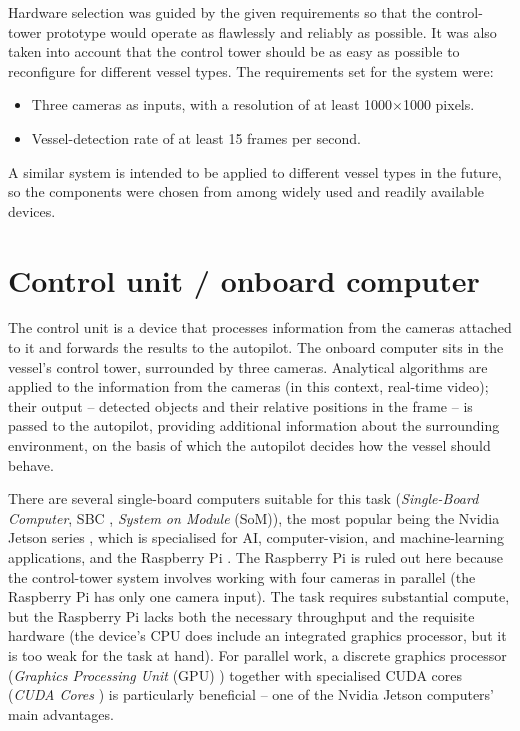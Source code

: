 
Hardware selection was guided by the given requirements so that the control-tower prototype would operate as flawlessly and reliably as possible. It was also taken into account that the control tower should be as easy as possible to reconfigure for different vessel types. The requirements set for the system were:

\begin{itemize}
\item
  Three cameras as inputs, with a resolution of at least 1000$\times$1000 pixels.
\item
  Vessel-detection rate of at least 15 frames per second.
\end{itemize}

A similar system is intended to be applied to different vessel types in the future, so the components were chosen from among widely used and readily available devices.

\section{Control unit / onboard computer}\label{control-unit-onboard-computer}

The control unit is a device that processes information from the cameras attached to it and forwards the results to the autopilot. The onboard computer sits in the vessel's control tower, surrounded by three cameras. Analytical algorithms are applied to the information from the cameras (in this context, real-time video); their output -- detected objects and their relative positions in the frame -- is passed to the autopilot, providing additional information about the surrounding environment, on the basis of which the autopilot decides how the vessel should behave.

There are several single-board computers suitable for this task (\emph{Single-Board Computer}, SBC \cite{ref19}, \emph{System on Module} (SoM)), the most popular being the Nvidia Jetson series \cite{ref20}, which is specialised for AI, computer-vision, and machine-learning applications, and the Raspberry Pi \cite{ref21}. The Raspberry Pi is ruled out here because the control-tower system involves working with four cameras in parallel (the Raspberry Pi has only one camera input). The task requires substantial compute, but the Raspberry Pi lacks both the necessary throughput and the requisite hardware (the device's CPU does include an integrated graphics processor, but it is too weak for the task at hand). For parallel work, a discrete graphics processor (\emph{Graphics Processing Unit} (GPU) \cite{ref22}) together with specialised CUDA cores (\emph{CUDA Cores} \cite{ref23}) is particularly beneficial -- one of the Nvidia Jetson computers' main advantages.

